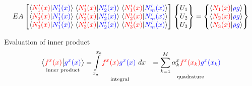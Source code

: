 \documentclass[submit,12pt]{aiaa-pretty} %
\begin{document}
      \begin{equation}\nonumber
    \setlength\arraycolsep{1.5pt}
    {EA}
    \begin{bmatrix}
      \left \langle {\color{red}{N_1^\prime(x)}} \vert {\color{blue}{N_1^\prime(x)}} \right \rangle &  \left \langle {\color{red}{N_1^\prime(x)}} \vert {\color{blue}{N_2^\prime(x)}} \right \rangle & \left \langle {\color{red}{N_1^\prime(x)}} \vert {\color{blue}{N_m^\prime(x)}} \right \rangle \\
      \left \langle {\color{red}{N_2^\prime(x)}} \vert {\color{blue}{N_1^\prime(x)}} \right \rangle &  \left \langle {\color{red}{N_2^\prime(x)}} \vert {\color{blue}{N_2^\prime(x)}} \right \rangle & \left \langle {\color{red}{N_2^\prime(x)}} \vert {\color{blue}{N_m^\prime(x)}} \right \rangle \\
      \left \langle {\color{red}{N_3^\prime(x)}} \vert {\color{blue}{N_1^\prime(x)}} \right \rangle &  \left \langle {\color{red}{N_3^\prime(x)}} \vert {\color{blue}{N_2^\prime(x)}} \right \rangle & \left \langle {\color{red}{N_3^\prime(x)}} \vert {\color{blue}{N_m^\prime(x)}} \right \rangle \\
    \end{bmatrix}
    \begin{Bmatrix}
      U_1 \\
      U_2 \\
      U_3 \\
    \end{Bmatrix}=
    \begin{Bmatrix}
      \left \langle {\color{red}{N_1(x)}} \vert {\color{blue}{\rho g}} \right \rangle \\
      \left \langle {\color{red}{N_2(x)}} \vert {\color{blue}{\rho g}} \right \rangle \\
      \left \langle {\color{red}{N_3(x)}} \vert {\color{blue}{\rho g}} \right \rangle \\ 
    \end{Bmatrix}    
  \end{equation}

Evaluation of  inner product
\begin{equation}\nonumber
  \begin{aligned}
    \underset{\text{inner~product}}{\left\langle {\color{red}{f^x(x)}} \big\vert  {\color{blue}{g^x(x)}} \right\rangle} &= \underset{\text{integral}}{\int\limits_{x_a}^{x_b}  {\color{red}{f^x(x)}}  {\color{blue}{g^x(x)}}~dx} &= \underset{\text{quadrature}}{\sum_{k=1}^M \alpha_k^x  {\color{red}{f^x(x_k)}}  {\color{blue}{g^x(x_k)}}}\\
  \end{aligned}
\end{equation}  
      
\end{document}
